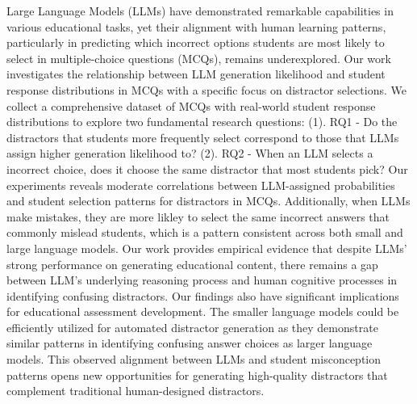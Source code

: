 Large Language Models (LLMs) have demonstrated remarkable capabilities in various educational tasks, yet their alignment with human learning patterns, particularly in predicting which incorrect options students are most likely to select in multiple-choice questions (MCQs), remains underexplored. Our work investigates the relationship between LLM generation likelihood and student response distributions in MCQs with a specific focus on distractor selections. We collect a comprehensive dataset of MCQs with real-world student response distributions to explore two fundamental research questions: (1). RQ1 - Do the distractors that students more frequently select correspond to those that LLMs assign higher generation likelihood to? (2). RQ2 - When an LLM selects a incorrect choice, does it choose the same distractor that most students pick? Our experiments reveals moderate correlations between LLM-assigned probabilities and student selection patterns for distractors in MCQs. Additionally, when LLMs make mistakes, they are more likley to select the same incorrect answers that commonly mislead students, which is a pattern consistent across both small and large language models. Our work provides empirical evidence that despite LLMs' strong performance on generating educational content, there remains a gap between LLM's underlying reasoning process and human cognitive processes in identifying confusing distractors. Our findings also have significant implications for educational assessment development. The smaller language models could be efficiently utilized for automated distractor generation as they demonstrate similar patterns in identifying confusing answer choices as larger language models. This observed alignment between LLMs and student misconception patterns opens new opportunities for generating high-quality distractors that complement traditional human-designed distractors.
